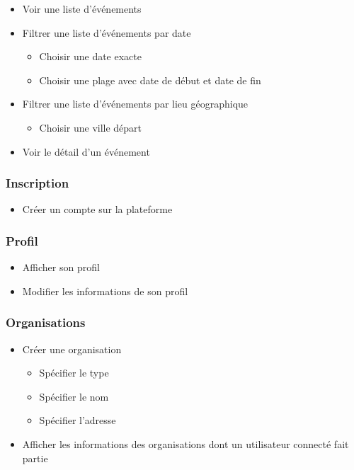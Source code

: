 \documentclass[11pt, a4paper, french, twoside]{article}
\begin{document}
			\begin{itemize}
				\item Voir une liste d'événements
				\item Filtrer une liste d'événements par date
				\begin{itemize}
					\item Choisir une date exacte
					\item Choisir une plage avec date de début et date de fin
				\end{itemize}
				\item Filtrer une liste d'événements par lieu géographique
				\begin{itemize}
					\item Choisir une ville départ
				\end{itemize}
				\item Voir le détail d'un événement
			\end{itemize}
		
			\subsubsection{Inscription}
				\begin{itemize}
					\item Créer un compte sur la plateforme
				\end{itemize}
			
			\subsubsection{Profil}
				\begin{itemize}
					\item Afficher son profil
					\item Modifier les informations de son profil
				\end{itemize}
			
			\subsubsection{Organisations}
				\begin{itemize}
					\item Créer une organisation
						\begin{itemize}
							\item Spécifier le type
							\item Spécifier le nom
							\item Spécifier l'adresse
						\end{itemize}
					\item Afficher les informations des organisations dont un utilisateur connecté fait partie
				\end{itemize}
			
\end{document}
